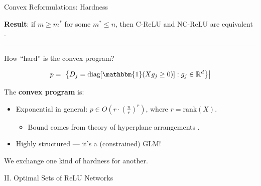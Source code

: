 \documentclass[usenames,dvipsnames,mathserif,notheorems]{beamer}
\newcommand{\horizontalrule}{
	{
			\vspace{-0.5em}
			\center \rule{\textwidth}{0.1em}
			\vspace{-0.2em}
		}
}
\newcommand{\bad}[1]{\textcolor{bad}{#1}}
\newcommand{\good}[1]{\textcolor{good}{#1}}
\begin{document}
\begin{frame}{Convex Reformulations: Hardness}

	\textbf{Result}: if \( m \geq m^* \) for some \( m^* \leq n \),
	then C-ReLU and NC-ReLU are \good{equivalent}
	\citep{pilanci2020convex}.

	\pause
	\horizontalrule

	How ``hard'' is the convex program?
	\pause

	\[
		p = \abs{\cbr{D_j = \text{diag}[\mathbbm{1}(X g_j \geq 0)] : g_j \in \R^d }}
	\]

	\vspace{2em}
	\pause

	The \textbf{convex program} is:
	\vspace{0.5em}
	\begin{itemize}
		\item \bad{Exponential in general}: \( p \in O(r \cdot (\frac{n}{r})^r) \),
		      where \( r = \text{rank}(X) \).
		      \vspace{0.25em}
		      \begin{itemize}
			      \item Bound comes from theory of hyperplane arrangements \citep{winder1966partitions}.
		      \end{itemize}
		      \pause

		      \vspace{0.5em}

		\item Highly \good{structured} --- it's a (constrained) GLM!
	\end{itemize}

	\vspace{1em}
	\pause

	\begin{center}
		\Large
		We exchange one kind of hardness for another.
	\end{center}

\end{frame}

\begin{frame}{}
	\begin{center}
		\huge II. Optimal Sets of ReLU Networks
	\end{center}
\end{frame}
\end{document}
